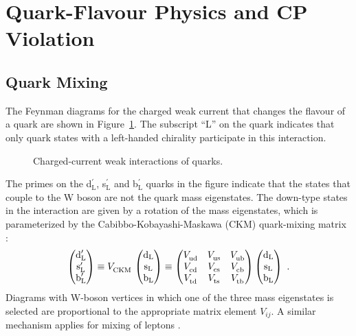 \section{Quark-Flavour Physics and CP Violation}
\label{sec:intro_CPV}

\subsection{Quark Mixing}
\label{subsec:intro_mixCPV_mix}

The Feynman diagrams for the charged weak current that changes the flavour of a quark are shown in Figure~\ref{fig:WCouplings}. The
subscript ``L'' on the quark indicates that only quark states with a left-handed chirality participate in this interaction.
\begin{figure}[hbt]
  {\sffamily }
  \caption{Charged-current weak interactions of quarks.}
  \label{fig:WCouplings}
\end{figure}

The primes on the d$_\text{L}^\prime$, s$_\text{L}^\prime$ and b$_\text{L}^\prime$ quarks in the figure indicate that the states that
couple to the W boson are not the quark mass eigenstates. The down-type states in the interaction are given by a rotation of the mass
eigenstates, which is parameterized by the Cabibbo-Kobayashi-Maskawa (CKM) quark-mixing matrix \cite{Kobayashi:1973fv}:
\begin{equation}
  \begin{pmatrix} \text{d}_\text{L}^\prime \\ \text{s}_\text{L}^\prime \\ \text{b}_\text{L}^\prime \end{pmatrix}
    \equiv \VCKM\, \begin{pmatrix} \text{d}_\text{L} \\ \text{s}_\text{L} \\ \text{b}_\text{L} \end{pmatrix}
    \equiv \begin{pmatrix} \Vud & \Vus & \Vub \\ \Vcd & \Vcs & \Vcb \\ \Vtd & \Vts & \Vtb \end{pmatrix}
           \begin{pmatrix} \text{d}_\text{L} \\ \text{s}_\text{L} \\ \text{b}_\text{L} \end{pmatrix}
    \ .
\end{equation}
Diagrams with W-boson vertices in which one of the three mass eigenstates is selected are proportional to the appropriate matrix element
$V_{ij}$. A similar mechanism applies for mixing of leptons \cite{Pontecorvo:1957cp,*Pontecorvo:1957qd,*Maki:1962mu,*Pontecorvo:1967fh}.

